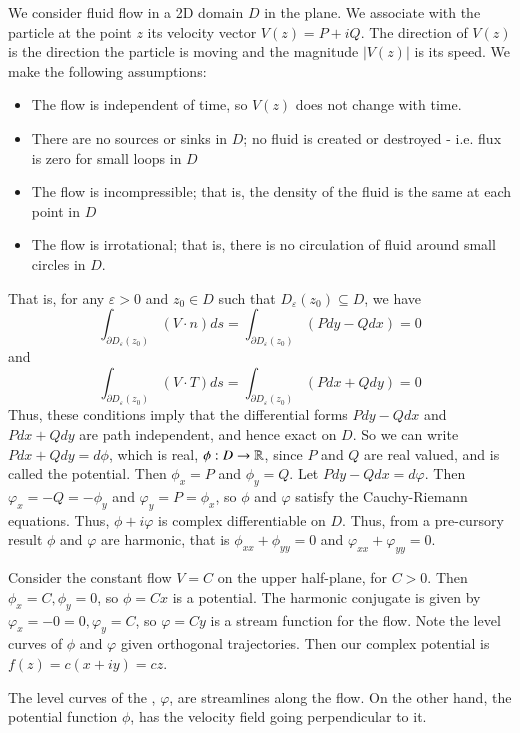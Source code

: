 \documentclass[12pt, a4paper, oneside, openright, titlepage]{book}
\begin{document}
We consider fluid flow in a 2D domain $D$ in the plane. We associate with the particle at the point $z$ its velocity vector $V(z) = P+iQ$. The direction of $V(z)$ is the direction the particle is moving and the magnitude $|V(z)|$ is its speed. We make the following assumptions: 
\begin{itemize}
    \item The flow is independent of time, so $V(z)$ does not change with time.
    \item There are no sources or sinks in $D$; no fluid is created or destroyed - i.e. flux is zero for small loops in $D$
    \item The flow is incompressible; that is, the density of the fluid is the same at each point in $D$
    \item The flow is irrotational; that is, there is no circulation of fluid around small circles in $D$.
\end{itemize}
That is, for any $\varepsilon > 0$ and $z_0 \in D$ such that $D_{\varepsilon}(z_0) \subseteq D$, we have \begin{equation*}
    \int_{\partial D_{\varepsilon}(z_0)}(V\cdot n)ds = \int_{\partial D_{\varepsilon}(z_0)}(Pdy-Qdx)= 0
\end{equation*}
and \begin{equation*}
    \int_{\partial D_{\varepsilon}(z_0)}(V\cdot T)ds = \int_{\partial D_{\varepsilon}(z_0)}(Pdx+Qdy) = 0
\end{equation*}
Thus, these conditions imply that the differential forms $Pdy-Qdx$ and $Pdx+Qdy$ are path independent, and hence exact on $D$. So we can write $Pdx+Qdy = d\phi$, which is real, $\phi:D\rightarrow \mathbb R$, since $P$ and $Q$ are real valued, and is called the potential. Then $\phi_x = P$ and $\phi_y = Q$. Let $Pdy-Qdx = d\varphi$. Then $\varphi_x = -Q = -\phi_y$ and $\varphi_y = P = \phi_x$, so $\phi$ and $\varphi$ satisfy the Cauchy-Riemann equations. Thus, $\phi+i\varphi$ is complex differentiable on $D$. Thus, from a pre-cursory result $\phi$ and $\varphi$ are harmonic, that is $\phi_{xx}+\phi_{yy} = 0$ and $\varphi_{xx}+\varphi_{yy} = 0$.

\begin{eg}
    Consider the constant flow $V = C$ on the upper half-plane, for $C > 0$. Then $\phi_x = C,\phi_y = 0$, so $\phi = Cx$ is a potential. The harmonic conjugate is given by $\varphi_x = -0 = 0,\varphi_y = C$, so $\varphi= Cy$ is a stream function for the flow. Note the level curves of $\phi$ and $\varphi$ given orthogonal trajectories. Then our complex potential is $f(z) = c(x+iy)=cz$. 
\end{eg}
The level curves of the , $\varphi$, are streamlines along the flow. On the other hand, the potential function $\phi$, has the velocity field going perpendicular to it.
\end{document}
